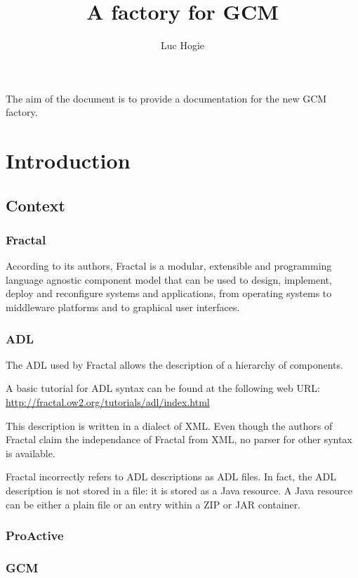 \documentclass{article}
\title{A factory for GCM}
\author{Luc Hogie}
\begin{document}
\maketitle
\tableofcontents
\newpage


The aim of the document is to provide a documentation for the new GCM factory.

\section{Introduction}

\subsection{Context}


\subsubsection{Fractal}

According to its authors, Fractal is a modular, extensible and programming language agnostic component model  that can be used to design, implement, deploy and reconfigure systems and applications, from operating systems to middleware platforms and to graphical user interfaces.

\subsubsection{ADL}

The ADL used by Fractal allows the description of a hierarchy of  components.

A basic tutorial for ADL syntax can be found at the following web URL:
\url{http://fractal.ow2.org/tutorials/adl/index.html}

This description is written in a dialect of XML.
Even though the authors of Fractal claim
the independance of Fractal from XML, no parser for other syntax is available.

Fractal incorrectly refers to ADL descriptions as ADL files. In fact, the ADL description
is not stored in a file: it is stored as a Java resource. A Java resource can be either a plain file
or an entry within a ZIP or JAR container.


\subsubsection{ProActive}

\subsubsection{GCM}
\end{document}
